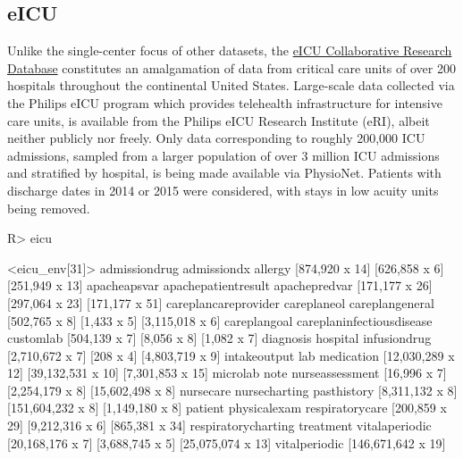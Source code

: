 \documentclass[
  notitle]{jss}
\begin{document}
\hypertarget{eicu}{%
\subsection{eICU}\label{eicu}}

Unlike the single-center focus of other datasets, the
\href{https://physionet.org/content/eicu-crd/2.0/}{eICU Collaborative
Research Database} constitutes an amalgamation of data from critical
care units of over 200 hospitals throughout the continental United
States. Large-scale data collected via the Philips eICU program which
provides telehealth infrastructure for intensive care units, is
available from the Philips eICU Research Institute (eRI), albeit neither
publicly nor freely. Only data corresponding to roughly 200,000 ICU
admissions, sampled from a larger population of over 3 million ICU
admissions and stratified by hospital, is being made available via
PhysioNet. Patients with discharge dates in 2014 or 2015 were
considered, with stays in low acuity units being removed.

\begin{CodeChunk}
\begin{CodeInput}
R> eicu
\end{CodeInput}
\begin{CodeOutput}
<eicu_env[31]>
            admissiondrug               admissiondx                   allergy 
           [874,920 x 14]             [626,858 x 6]            [251,949 x 13] 
             apacheapsvar       apachepatientresult             apachepredvar 
           [171,177 x 26]            [297,064 x 23]            [171,177 x 51] 
     careplancareprovider               careplaneol           careplangeneral 
            [502,765 x 8]               [1,433 x 5]           [3,115,018 x 6] 
             careplangoal careplaninfectiousdisease                 customlab 
            [504,139 x 7]               [8,056 x 8]               [1,082 x 7] 
                diagnosis                  hospital              infusiondrug 
          [2,710,672 x 7]                 [208 x 4]           [4,803,719 x 9] 
             intakeoutput                       lab                medication 
        [12,030,289 x 12]         [39,132,531 x 10]          [7,301,853 x 15] 
                 microlab                      note           nurseassessment 
             [16,996 x 7]           [2,254,179 x 8]          [15,602,498 x 8] 
                nursecare             nursecharting               pasthistory 
          [8,311,132 x 8]         [151,604,232 x 8]           [1,149,180 x 8] 
                  patient              physicalexam           respiratorycare 
           [200,859 x 29]           [9,212,316 x 6]            [865,381 x 34] 
      respiratorycharting                 treatment            vitalaperiodic 
         [20,168,176 x 7]           [3,688,745 x 5]         [25,075,074 x 13] 
            vitalperiodic 
       [146,671,642 x 19] 
\end{CodeOutput}
\end{CodeChunk}
\end{document}
